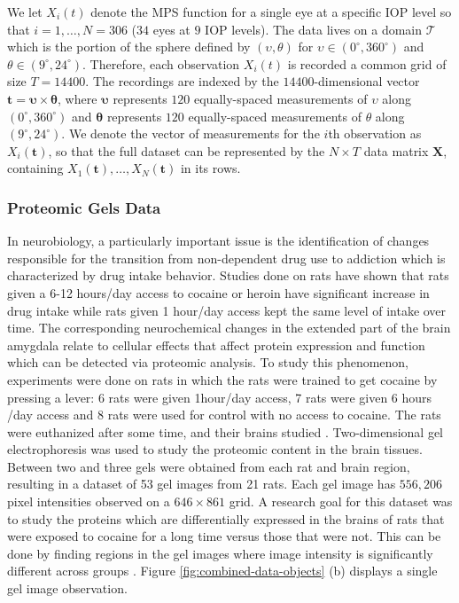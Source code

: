 We let $X_i(t)$ denote the MPS function for a single eye at a specific IOP level so that $i = 1, \dots, N = 306$ ($34$ eyes at $9$ IOP levels).
The data lives on a domain $\mathcal{T}$ which is the portion of the sphere defined by $(\upsilon, \theta)$ for $\upsilon \in (0^{\circ}, 360^{\circ})$ and $\theta \in (9^{\circ}, 24^{\circ})$.
Therefore, each observation $X_i(t)$ is recorded a common grid of size $T = 14400$.
The recordings are indexed by the $14400$-dimensional vector $\mathbf{t} = \boldsymbol{\upsilon} \times \boldsymbol{\theta}$, where $\boldsymbol{\upsilon}$ represents $120$ equally-spaced measurements of $\upsilon$ along $(0^{\circ}, 360^{\circ})$ and $\boldsymbol{\theta}$ represents $120$ equally-spaced measurements of $\theta$ along $(9^{\circ}, 24^{\circ})$.
We denote the vector of measurements for the $i$th observation as $X_i(\mathbf{t})$, so that the full dataset can be represented by the $N \times T$ data matrix $\mathbf{X}$, containing $X_1(\mathbf{t}), \dots, X_N(\mathbf{t})$ in its rows.

\subsubsection{Proteomic Gels Data}

In neurobiology, a particularly important issue is the identification of changes responsible for the transition from non-dependent drug use to addiction which is characterized by drug intake behavior. Studies done on rats have shown that rats given a 6-12 hours/day access to cocaine or heroin have significant increase in drug intake while rats given 1 hour/day access kept the same level of intake over time.
The corresponding neurochemical changes in the extended part of the brain amygdala relate to cellular effects that affect protein expression and function which can be detected via proteomic analysis. To study this phenomenon, experiments were done on rats in which the rats were trained to get cocaine by pressing a lever: 6 rats were given 1hour/day access, 7 rats were given 6 hours /day access and 8 rats were used for control with no access to cocaine. The rats were euthanized after some time, and their brains studied \parencite{morris_pinnacle_2008}. 
Two-dimensional gel electrophoresis was used to study the proteomic content in the brain tissues. 
Between two and three gels were obtained from each rat and brain region, resulting in a dataset of 53 gel images from 21 rats.
Each gel image has $556,206$ pixel intensities observed on a $646 \times 861$ grid. 
A research goal for this dataset was to study the proteins which are differentially expressed in the brains of rats that were exposed to cocaine for a long time versus those that were not.
This can be done by finding regions in the gel images where image intensity is significantly different across groups \parencite{morris_statistical_2012}. 
Figure \ref{fig:combined-data-objects} (b) displays a single gel image observation.

